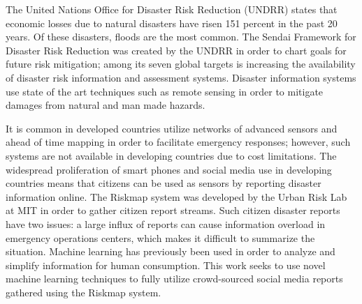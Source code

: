 
% 
% 
%


The United Nations Office for Disaster Risk Reduction (UNDRR) states that economic losses
due to natural disasters have risen 151 percent in the past 20 years. Of these
disasters, floods are the most common. The Sendai Framework for Disaster Risk Reduction
was created by the UNDRR in order to chart goals for future risk mitigation; among its
seven global targets is increasing the availability of disaster risk information
and assessment systems. Disaster information systems use state of the art techniques such as
remote sensing in order to mitigate damages from natural and man made hazards.

It is common in developed countries utilize networks of advanced sensors and
ahead of time mapping in order to facilitate emergency responses;
however, such systems are not available in developing countries due to cost limitations.
The widespread proliferation of smart phones and social media use in
developing countries means that citizens can be used as sensors by reporting
disaster information online. The Riskmap system was developed by the
Urban Risk Lab at MIT in order to gather citizen report streams. Such citizen
disaster reports have two issues:  a large influx of reports can cause
information overload in emergency operations centers, which makes it difficult to
summarize the situation. Machine learning has previously been used in order to
analyze and simplify information for human consumption. This work seeks to use
novel machine learning techniques to fully utilize crowd-sourced social media reports gathered
using the Riskmap system.

